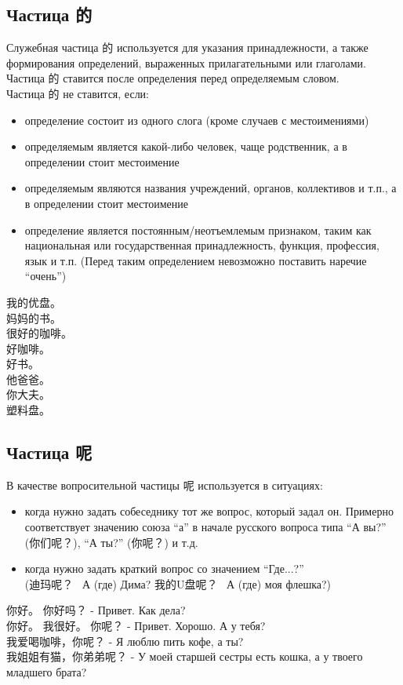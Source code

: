\subsection{Частица 的}
Служебная частица 的 используется для указания принадлежности, а также формирования определений, выраженных прилагательными или глаголами.\\
Частица 的 ставится после определения перед определяемым словом.\\
Частица 的 не ставится, если:
\begin{itemize}
	\item определение состоит из одного слога
	(кроме случаев с местоимениями)
	\item определяемым является какой-либо человек, чаще родственник, а в определении стоит местоимение
	\item определяемым являются названия учреждений, органов, коллективов и т.п., а в определении стоит местоимение
	\item определение является постоянным/неотъемлемым признаком, таким как национальная или государственная принадлежность, функция, профессия, язык и т.п. (Перед таким определением невозможно
	поставить наречие “очень”)
\end{itemize}
\begin{example}\hfill \break \LARGE
	我的优盘。\\
	妈妈的书。\\
	很好的咖啡。\\
	好咖啡。\\
	好书。\\
	他爸爸。\\
	你大夫。\\
	塑料盘。\\
\end{example}


\subsection{Частица 呢}
В качестве вопросительной частицы 呢 используется в ситуациях:
\begin{itemize}
	\item когда нужно задать собеседнику тот же вопрос, который задал он. Примерно соответствует
	значению союза “а” в начале русского вопроса типа “А вы?” (你们呢？), “А ты?” (你呢？)
	и т.д.
	\item когда нужно задать краткий вопрос со значением “Где...?”\\
	(迪玛呢？~ А (где) Дима? 我的U盘呢？~ А (где) моя флешка?)
\end{itemize}
\begin{example}\hfill \break \LARGE
	你好。 你好吗？ - Привет. Как дела?\\
	你好。 我很好。 你呢？ - Привет. Хорошо. А у тебя?\\
	我爱喝咖啡，你呢？ - Я люблю пить кофе, а ты?\\
	我姐姐有猫，你弟弟呢？ - У моей старшей сестры есть кошка, а у твоего младшего брата?
\end{example}

